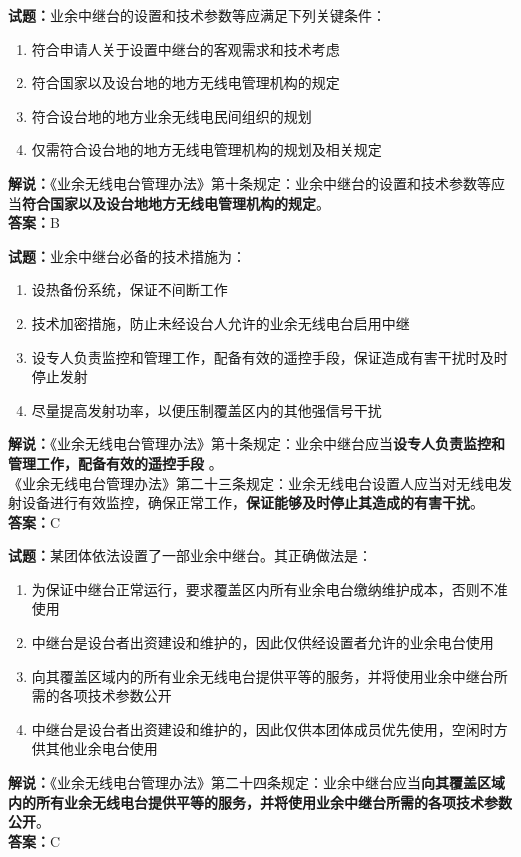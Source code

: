 \documentclass{ctexbook}
\begin{document}
\bigskip


\noindent\textbf{试题：}业余中继台的设置和技术参数等应满足下列关键条件：
\begin{enumerate}[leftmargin=3em]
\item 符合申请人关于设置中继台的客观需求和技术考虑
\item 符合国家以及设台地的地方无线电管理机构的规定
\item 符合设台地的地方业余无线电民间组织的规划
\item 仅需符合设台地的地方无线电管理机构的规划及相关规定
\end{enumerate}
\noindent\textbf{解说：}《业余无线电台管理办法》第十条规定：业余中继台的设置和技术参数等应当\textbf{符合国家以及设台地地方无线电管理机构的规定}。\\\noindent\textbf{答案：}B



\bigskip


\noindent\textbf{试题：}业余中继台必备的技术措施为：
\begin{enumerate}[leftmargin=3em]
\item 设热备份系统，保证不间断工作
\item 技术加密措施，防止未经设台人允许的业余无线电台启用中继
\item 设专人负责监控和管理工作，配备有效的遥控手段，保证造成有害干扰时及时停止发射
\item 尽量提高发射功率，以便压制覆盖区内的其他强信号干扰
\end{enumerate}
\noindent\textbf{解说：}《业余无线电台管理办法》第十条规定：业余中继台应当\textbf{设专人负责监控和管理工作，配备有效的遥控手段 }。\\
《业余无线电台管理办法》第二十三条规定：业余无线电台设置人应当对无线电发射设备进行有效监控，确保正常工作，\textbf{保证能够及时停止其造成的有害干扰}。 \\\noindent\textbf{答案：}C


\bigskip


\noindent\textbf{试题：}某团体依法设置了一部业余中继台。其正确做法是：
\begin{enumerate}[leftmargin=3em]
\item 为保证中继台正常运行，要求覆盖区内所有业余电台缴纳维护成本，否则不准使用
\item 中继台是设台者出资建设和维护的，因此仅供经设置者允许的业余电台使用
\item 向其覆盖区域内的所有业余无线电台提供平等的服务，并将使用业余中继台所需的各项技术参数公开
\item 中继台是设台者出资建设和维护的，因此仅供本团体成员优先使用，空闲时方供其他业余电台使用
\end{enumerate}
\noindent\textbf{解说：}《业余无线电台管理办法》第二十四条规定：业余中继台应当\textbf{向其覆盖区域内的所有业余无线电台提供平等的服务，并将使用业余中继台所需的各项技术参数公开}。\\\noindent\textbf{答案：}C
\end{document}
